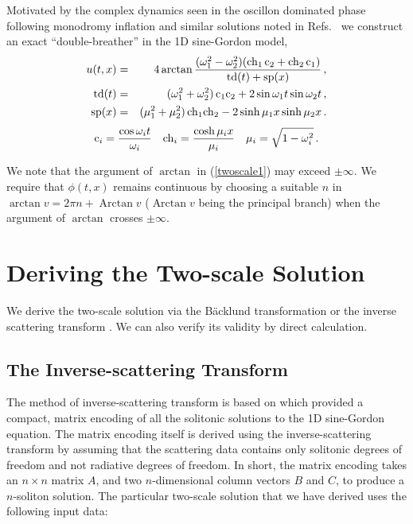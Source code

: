 \documentclass[%
reprint,
superscriptaddress,
amsmath,amssymb,
aps,
prd,
floatfix,
nofootinbib
]{revtex4-1}
\def\ch{{\rm ch}}
\def\cs{{\rm c}}
\def\td{{\rm td}}
\def\sp{{\rm sp}}
\DeclareMathOperator{\Arctan}{Arctan}
\begin{document}
Motivated by the complex dynamics seen in the oscillon dominated phase \cite{Amin:2011hj} following monodromy inflation \cite{Silverstein:2008sg,McAllister:2008hb,Flauger:2009ab} and similar solutions noted in Refs.~\cite{Hindmarsh:2006ur,Amin:2010xe,Salmi:2012ta} we  construct an exact  ``double-breather'' in the 1D sine-Gordon model, 
%
 \begin{eqnarray}\label{twoscale1}
  u(t,x)&=&4 \arctan \frac{(\omega_1^2-\omega_2^2)(\ch_1\,\cs_2+\ch_2\,\cs_1)}{\td(t)+\sp(x)} \, , \\
    \td(t) &=& (\omega_1^2+\omega_2^2)\,\cs_1\cs_2 +2 \sin \omega_1 t \sin \omega_2 t \, , \\
  \sp(x) &=& (\mu_1^2+\mu_2^2)\,\ch_1\ch_2 - 2  \sinh \mu_1 x \sinh \mu_2 x  \, .
\end{eqnarray}
%
\begin{equation}\label{twoscale2}
    \cs_i = \frac{\cos \omega_i t}{\omega_i} \quad \ch_i = \frac{\cosh \mu_i x}{\mu_i}  \quad   \mu_i=\sqrt{1-\omega_i^2} \, .
\end{equation}    

We note that the argument of $\arctan$ in (\ref{twoscale1}) may exceed $\pm\infty$. We require that $\phi(t,x)$ remains continuous by choosing a suitable $n$ in $\arctan v = 2\pi n+ \Arctan v$ ($\Arctan v$ being the principal branch) when the argument of $\arctan$ crosses $\pm\infty$.

\section{Deriving the Two-scale Solution}
We derive the two-scale solution via the B\"acklund transformation  \cite{Dodd499, hietarinta1997introduction, Cuenda20111047} or the  inverse scattering transform \cite{ablowitz, :/content/aip/journal/jmp/51/12/10.1063/1.3520596}. We can also verify its validity by direct calculation.

\subsection{The Inverse-scattering Transform}
The method of inverse-scattering transform is based on \cite{:/content/aip/journal/jmp/51/12/10.1063/1.3520596} which provided a compact, matrix encoding of all the solitonic solutions to the 1D sine-Gordon equation. The matrix encoding itself is derived using the inverse-scattering transform by assuming that the scattering data contains only solitonic degrees of freedom and not radiative degrees of freedom. In short, the matrix encoding takes an $n\times n$ matrix $A$, and two $n$-dimensional column vectors $B$ and $C$, to produce a $n$-soliton solution. The particular two-scale solution that we have derived uses the following input data:
\end{document}
